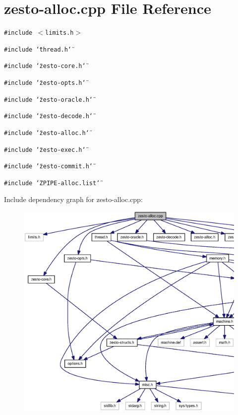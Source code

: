 \section{zesto-alloc.cpp File Reference}
\label{zesto-alloc_8cpp}
{\tt \#include $<$limits.h$>$}\par
{\tt \#include \char`\"{}thread.h\char`\"{}}\par
{\tt \#include \char`\"{}zesto-core.h\char`\"{}}\par
{\tt \#include \char`\"{}zesto-opts.h\char`\"{}}\par
{\tt \#include \char`\"{}zesto-oracle.h\char`\"{}}\par
{\tt \#include \char`\"{}zesto-decode.h\char`\"{}}\par
{\tt \#include \char`\"{}zesto-alloc.h\char`\"{}}\par
{\tt \#include \char`\"{}zesto-exec.h\char`\"{}}\par
{\tt \#include \char`\"{}zesto-commit.h\char`\"{}}\par
{\tt \#include \char`\"{}ZPIPE-alloc.list\char`\"{}}\par


Include dependency graph for zesto-alloc.cpp:\nopagebreak
\begin{figure}[H]
\begin{center}
\leavevmode
\includegraphics[width=420pt]{zesto-alloc_8cpp__incl}
\end{center}
\end{figure}
